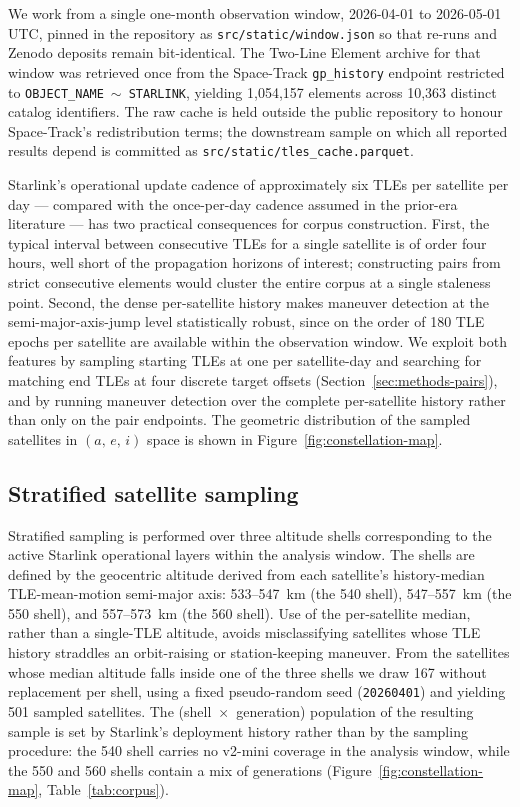 \documentclass[10pt, letterpaper]{article}
\begin{document}
We work from a single one-month observation window, 2026-04-01 to
2026-05-01 UTC, pinned in the repository as
\texttt{src/static/window.json} so that re-runs and Zenodo deposits
remain bit-identical. The Two-Line Element archive for that window
was retrieved once from the Space-Track \texttt{gp\_history} endpoint
restricted to \texttt{OBJECT\_NAME}~$\sim$~\texttt{STARLINK},
yielding 1{,}054{,}157 elements across 10{,}363 distinct catalog
identifiers. The raw cache is held outside the public repository to
honour Space-Track's redistribution terms; the downstream sample on
which all reported results depend is committed as
\texttt{src/static/tles\_cache.parquet}.

Starlink's operational update cadence of approximately six TLEs per
satellite per day --- compared with the once-per-day cadence assumed
in the prior-era literature \citep{vallado2006,vallado2012} --- has
two practical consequences for corpus construction. First, the
typical interval between consecutive TLEs for a single satellite is
of order four hours, well short of the propagation horizons of
interest; constructing pairs from strict consecutive elements would
cluster the entire corpus at a single staleness point. Second, the
dense per-satellite history makes maneuver detection at the
semi-major-axis-jump level statistically robust, since on the order
of 180 TLE epochs per satellite are available within the
observation window. We exploit both features by sampling starting
TLEs at one per satellite-day and searching for matching end TLEs at
four discrete target offsets (Section~\ref{sec:methods-pairs}), and
by running maneuver detection over the complete per-satellite
history rather than only on the pair endpoints. The geometric
distribution of the sampled satellites in
$(a,\,e,\,i)$ space is shown in Figure~\ref{fig:constellation-map}.

\subsection{Stratified satellite sampling}
\label{sec:methods-sampling}

Stratified sampling is performed over three altitude shells
corresponding to the active Starlink operational layers within the
analysis window. The shells are defined by the geocentric altitude
derived from each satellite's history-median TLE-mean-motion
semi-major axis: 533--547~km (the 540 shell), 547--557~km (the 550
shell), and 557--573~km (the 560 shell). Use of the per-satellite
median, rather than a single-TLE altitude, avoids misclassifying
satellites whose TLE history straddles an orbit-raising or
station-keeping maneuver. From the satellites whose median altitude
falls inside one of the three shells we draw 167 without replacement
per shell, using a fixed pseudo-random seed (\texttt{20260401}) and
yielding 501 sampled satellites. The (shell~$\times$~generation)
population of the resulting sample is set by Starlink's deployment
history rather than by the sampling procedure: the 540 shell carries
no v2-mini coverage in the analysis window, while the 550 and 560
shells contain a mix of generations
(Figure~\ref{fig:constellation-map}, Table~\ref{tab:corpus}).
\end{document}
